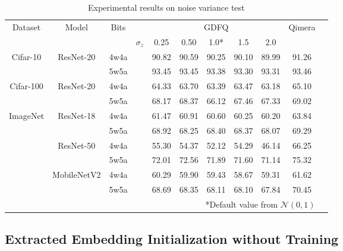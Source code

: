 \documentclass{article}
\newcommand{\aname}{Qimera\xspace}
\begin{document}
\begin{table}[h]
\centering
\caption{Experimental results on noise variance test}
    \label{tab:noise}    
    \resizebox{\textwidth}{!}
    {
    \begin{tabular}{cccp{0.1cm}ccccccc}
    \toprule
    \multirow{2}{*}{Dataset} & \multirow{2}{*}{Model} & \multirow{2}{*}{Bits} & & \multicolumn{5}{c}{GDFQ} & \multirow{2}{*}{\aname} &  \\
    \cmidrule(lr){5-9}
&&&$\sigma_{z}$& 0.25 & 0.50 & 1.0* & 1.5 & 2.0 &  \\ \midrule
\multirow{2}{*}{Cifar-10} & \multirow{2}{*}{ResNet-20} & 4w4a &&90.82 &90.59 &90.25 &90.10&89.99  &91.26\\
& &5w5a &&93.45 &93.45 &93.38 &93.30&93.31 &93.46\\
\midrule
\multirow{2}{*}{Cifar-100} & \multirow{2}{*}{ResNet-20} & 4w4a &&64.33 &63.70 &63.39 &63.47&63.18&65.10\\
& &5w5a &&68.17 &68.37 &66.12 &67.46&67.33&69.02\\
\midrule
\multirow{6}{*}{ImageNet} & \multirow{2}{*}{ResNet-18} & 4w4a &&61.47 &60.91 &60.60 &60.25&60.20&63.84\\
& &5w5a &&68.92 &68.25 &68.40 &68.37&68.07&69.29\\
& \multirow{2}{*}{ResNet-50} & 4w4a &&55.30 &54.37 &52.12 &54.29&46.14&66.25\\
& &5w5a &&72.01 &72.56 &71.89 &71.60&71.14&75.32\\
& \multirow{2}{*}{MobileNetV2} & 4w4a &&60.29 &59.90 &59.43 &58.67&59.31&61.62\\
& &5w5a &&68.69 &68.35 &68.11 &68.10&67.84&70.45\\
                                     
    \bottomrule
    \multicolumn{10}{r}{*Default value from $\mathcal{N}(0,1)$}

    \end{tabular}
    }

\end{table}









\subsection{Extracted Embedding Initialization without Training}
\end{document}
